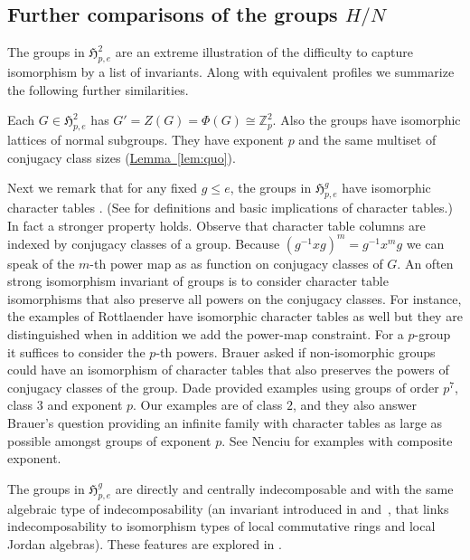 \documentclass[11pt]{article}
\numberwithin{equation}{section}
\theoremstyle{definition}
\theoremstyle{plain}
\newcommand{\expref}[2]{\hyperref[#2]{#1~\ref{#2}}}
\numberwithin{equation}{section}
\theoremstyle{plain}       %
\theoremstyle{remark}
\theoremstyle{definition}
\numberwithin{figure}{section}
\numberwithin{table}{section}
\newcommand{\mygroups}{\mathfrak{H}}
\begin{document}
\subsection{Further comparisons of the groups \texorpdfstring{$H/N$}{H/N}}\label{sec:invariants}


The groups in $\mygroups_{p,e}^{2}$ are an extreme illustration of the
difficulty to capture isomorphism by a list of invariants.  Along with
equivalent profiles we summarize the following further similarities.
\medskip

Each $G\in \mygroups_{p,e}^{2}$ has $G'=Z(G)=\Phi(G)\cong \mathbb{Z}_p^2$.  Also
the groups have isomorphic lattices of normal subgroups.  They have exponent $p$
and the same multiset of conjugacy class sizes (\expref{Lemma}{lem:quo}).


Next we remark that for any fixed $g\leq e$, the groups in $\mygroups_{p,e}^{g}$
have isomorphic character tables \cite[Section~6.2]{LW}. (See
\cite[p. 232]{Robinson}
for definitions and basic implications of character tables.)  In fact a stronger
property holds.  Observe that character table columns are indexed by conjugacy
classes of a group.  Because $(g^{-1}xg)^m=g^{-1}x^m g$ we can speak of the
$m$-th power map as as function on conjugacy classes of $G$.  An often strong
isomorphism invariant of groups is to consider character table isomorphisms that
also preserve all powers on the conjugacy classes.  For instance, the examples
of Rottlaender have isomorphic character tables as well but they are
distinguished when in addition we add the power-map constraint. For a $p$-group
it suffices to consider the $p$-th powers.  Brauer asked if non-isomorphic
groups could have an isomorphism of character tables that also preserves the
powers of conjugacy classes of the group.  Dade \cite{Dade} provided examples
using groups of order $p^7$, class $3$ and exponent $p$.  Our examples are of
class $2$, and they also answer Brauer's question providing an infinite family
with character tables as large as possible amongst groups of exponent $p$.  See
Nenciu \cite{Nenciu} for examples with composite exponent.


The groups in $\mygroups_{p,e}^{g}$ are directly and centrally indecomposable
and with the same algebraic type of indecomposability (an invariant introduced
in \cite[Theorem~4.41]{Wilson:unique-cent} and~\cite[Theorem~8]{Wilson:RemakI},
that links indecomposability to isomorphism types of local commutative rings and
local Jordan algebras). These features are explored in \cite[Section 5]{LW}. 
\end{document}
